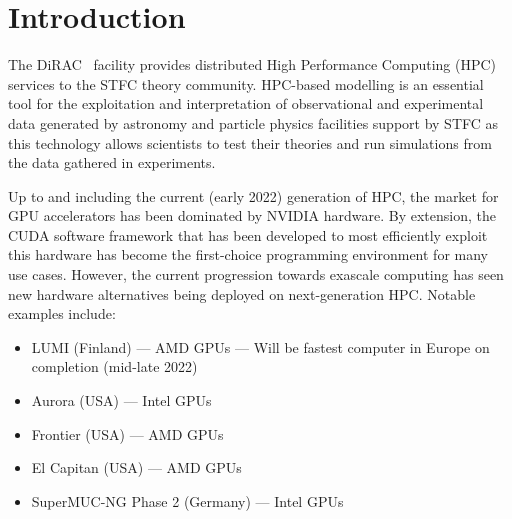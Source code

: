 
\section{Introduction}\label{sec:intro}

The DiRAC~\cite{dirac_distributed_nodate} facility provides distributed High Performance Computing (HPC) services to the STFC theory community.
HPC-based modelling is an essential tool for the exploitation and interpretation of observational and experimental data generated by astronomy and particle physics facilities support by STFC as this technology allows scientists to test their theories and run simulations from the data gathered in experiments.

Up to and including the current (early 2022) generation of HPC, the market for GPU accelerators has been dominated by NVIDIA hardware.
By extension, the CUDA software framework that has been developed to most efficiently exploit this hardware has become the first-choice programming environment for many use cases.
However, the current progression towards exascale computing has seen new hardware alternatives being deployed on next-generation HPC.
Notable examples include:

\begin{itemize}
	\item LUMI (Finland) --- AMD GPUs --- Will be fastest computer in Europe on completion (mid-late 2022)
	\item Aurora (USA) --- Intel GPUs
	\item Frontier (USA) --- AMD GPUs
	\item El Capitan (USA) --- AMD GPUs
	\item SuperMUC-NG Phase 2 (Germany) --- Intel GPUs
\end{itemize}
